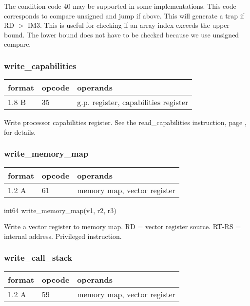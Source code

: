 \documentclass[forwardcom.tex]{subfiles}
\begin{document}
The condition code 40 may be supported in some implementations. This code corresponds  to compare unsigned and jump if above. This will generate a trap if RD $>$ IM3. This is useful for checking if an array index exceeds the upper bound. The lower bound does not have to be checked because we use unsigned compare. 


\subsubsection{write\_capabilities}
\label{table:writeCapabilitiesInstruction}
\begin{tabular}{|p{12mm}|p{12mm}|p{110mm}|}
\hline
\bfseries format & \bfseries opcode & \bfseries operands \\ \hline
1.8 B & 35 & g.p. register, capabilities register \\ \hline
\end{tabular}
\vspace{2mm}

Write processor capabilities register. See the read\_capabilities instruction, page \pageref{table:readCapabilitiesInstruction}, for details.

\subsubsection{write\_memory\_map}
\label{table:writeMemoryMapInstruction}\begin{tabular}{|p{12mm}|p{12mm}|p{110mm}|}
\hline
\bfseries format & \bfseries opcode & \bfseries operands \\ \hline
1.2 A & 61 & memory map, vector register \\ \hline
\end{tabular}
\vspace{2mm}

int64 write\_memory\_map(v1, r2, r3)
\vspace{2mm}

Write a vector register to memory map. RD = vector register source. RT-RS = internal address. Privileged instruction.
\vspace{2mm}

\subsubsection{write\_call\_stack}
\label{table:writeCallStackInstruction}\begin{tabular}{|p{12mm}|p{12mm}|p{110mm}|}
\hline
\bfseries format & \bfseries opcode & \bfseries operands \\ \hline
1.2 A & 59 & memory map, vector register \\ \hline
\end{tabular}
\vspace{2mm}
\end{document}
